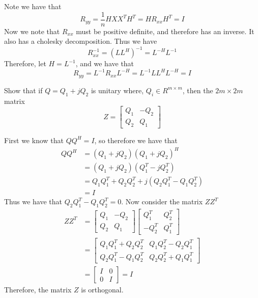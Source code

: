 \documentclass{homework}
\begin{document}
\begin{solution}
  Note we have that 
\[ R_{yy} = \frac{1}{n} HXX^TH^T = HR_{xx}H^T = I\]
  Now we note that $R_{xx}$ must be positive definite, and therefore has an inverse. It also has a cholesky decomposition. Thus we have 
  \[ R_{xx}^{-1} = (LL^H)^{-1} = L^{-H}L^{-1}\]
  Therefore, let $H = L^{-1}$, and we have that
  \[R_{yy} = L^{-1}R_{xx}L^{-H} = L^{-1}LL^{H}L^{-H} = I\]
\end{solution}

\begin{problem}[5-17]
  Show that if $Q = Q_1 + jQ_2$ is unitary where, $Q_i \in R^{m \times m}$, then the $2m \times 2m$ matrix
  \[
    Z=
    \begin{bmatrix}
      Q_1 & -Q_2 \\
      Q_2 & Q_1
    \end{bmatrix}
  \]
\end{problem}

\begin{solution}
  First we know that $QQ^H = I$, so therefore we have that
  \[
    \begin{aligned}
      QQ^H &= (Q_1 + jQ_2)(Q_1 + jQ_2)^H \\
           &= (Q_1 + jQ_2)(Q_1^T - jQ_2^T) \\
           &= Q_1Q_1^T + Q_2Q_2^T + j(Q_2Q_1^T - Q_1Q_2^T) \\ 
           &= I
    \end{aligned}
  \]
  Thus we have that $Q_2Q_1^T - Q_1Q_2^T = 0$. Now consider the matrix $ZZ^T$
  \[
    \begin{aligned}
    ZZ^T &=
    \begin{bmatrix}
      Q_1 & -Q_2 \\
      Q_2 & Q_1
    \end{bmatrix}
    \begin{bmatrix}
      Q_1^T & Q_2^T \\
      -Q_2^T & Q_1^T
    \end{bmatrix} \\
    &=
    \begin{bmatrix}
      Q_1Q_1^T + Q_2Q_2^T & Q_1Q_2^T - Q_2Q_1^T \\ 
      Q_2Q_1^T - Q_1Q_2^T & Q_2Q_2^T + Q_1Q_1^T
    \end{bmatrix} \\
    &=
    \begin{bmatrix}
      I & 0 \\ 
      0 & I
    \end{bmatrix} = I
    \end{aligned}
  \]
  Therefore, the matrix $Z$ is orthogonal.
\end{solution}
\end{document}
